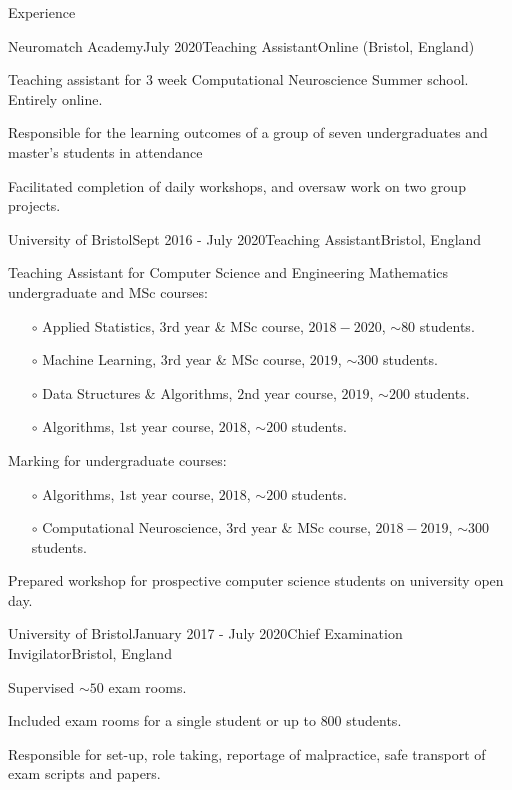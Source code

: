 \documentclass{resume} %
\begin{document}
\begin{rSection}{Experience}

  \begin{rSubsection}{Neuromatch Academy}{July 2020}{Teaching Assistant}{Online (Bristol, England)}
    \item Teaching assistant for 3 week Computational Neuroscience Summer school. Entirely online.
    \item Responsible for the learning outcomes of a group of seven undergraduates and master's students in attendance
    \item Facilitated completion of daily workshops, and oversaw work on two group projects.
  \end{rSubsection}

  \begin{rSubsection}{University of Bristol}{Sept 2016 - July 2020}{Teaching Assistant}{Bristol, England}
    \item Teaching Assistant for Computer Science and Engineering Mathematics undergraduate and MSc courses:
      \begin{itemize}
        \item[$\circ$] Applied Statistics, $3$rd year \&  MSc course, $2018 - 2020$, $\sim 80$ students.
        \item[$\circ$] Machine Learning, $3$rd year \& MSc course, $2019$, $\sim 300$ students.
        \item[$\circ$] Data Structures \& Algorithms, $2$nd year course, $2019$, $\sim 200$ students.
        \item[$\circ$] Algorithms, $1$st year course, $2018$, $\sim 200$ students.
      \end{itemize}\vspace{1.5mm}
    \item Marking for undergraduate courses:
      \begin{itemize}
        \item[$\circ$] Algorithms, $1$st year course, $2018$, $\sim 200$ students.
        \item[$\circ$] Computational Neuroscience, $3$rd year \& MSc course, $2018-2019$, $\sim 300$ students.
      \end{itemize}\vspace{1.5mm}
    \item Prepared workshop for prospective computer science students on university open day.
  \end{rSubsection}

  \begin{rSubsection}{University of Bristol}{January 2017 - July 2020}{Chief Examination Invigilator}{Bristol, England}
    \item Supervised $\sim 50$ exam rooms.
    \item Included exam rooms for a single student or up to $800$ students.
    \item Responsible for set-up, role taking, reportage of malpractice, safe transport of exam scripts and papers.
  \end{rSubsection}


\end{rSection}
\end{document}
